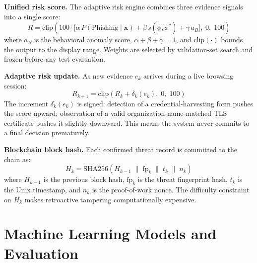 \documentclass[conference]{IEEEtran}
\begin{document}
\noindent\textbf{Unified risk score.}
The adaptive risk engine combines three evidence signals into a single score:
\begin{equation}
  R = \mathrm{clip}\!\left(100\cdot\bigl[\alpha\,P(\text{Phishing}\mid\mathbf{x}) +
       \beta\,s(\phi,\phi^*) + \gamma\,a_B\bigr],\;0,\;100\right)
  \label{eq:risk}
\end{equation}
where $a_B$ is the behavioral anomaly score, $\alpha+\beta+\gamma=1$, and $\mathrm{clip}(\cdot)$
bounds the output to the display range.
Weights are selected by validation-set search and frozen before any test evaluation.

\noindent\textbf{Adaptive risk update.}
As new evidence $e_k$ arrives during a live browsing session:
\begin{equation}
  R_{k+1} = \mathrm{clip}\!\left(R_k + \delta_k(e_k),\;0,\;100\right)
  \label{eq:adapt}
\end{equation}
The increment $\delta_k(e_k)$ is signed: detection of a credential-harvesting form pushes the
score upward; observation of a valid organization-name-matched TLS certificate pushes it slightly
downward.
This means the system never commits to a final decision prematurely.

\noindent\textbf{Blockchain block hash.}
Each confirmed threat record is committed to the chain as:
\begin{equation}
  H_k = \mathrm{SHA256}\!\left(H_{k-1} \;\|\; \mathrm{fp}_k \;\|\; t_k \;\|\; n_k\right)
  \label{eq:chain}
\end{equation}
where $H_{k-1}$ is the previous block hash, $\mathrm{fp}_k$ is the threat fingerprint hash,
$t_k$ is the Unix timestamp, and $n_k$ is the proof-of-work nonce.
The difficulty constraint on $H_k$ makes retroactive tampering computationally expensive.

\section{Machine Learning Models and Evaluation}
\end{document}
